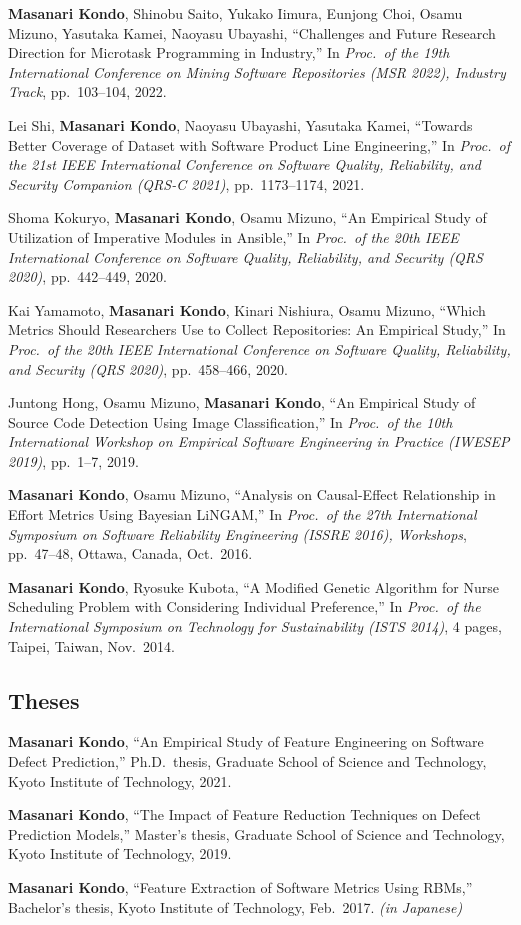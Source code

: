 \documentclass[10pt,a4paper]{article}
\newcommand{\me}{\textbf{Masanari Kondo}}
\newcommand{\inJP}{\textit{(in Japanese)}}
\begin{document}
\begin{publist}[label={[C\arabic*]}]
  \item \me, Shinobu Saito, Yukako Iimura, Eunjong Choi, Osamu Mizuno, Yasutaka Kamei, Naoyasu Ubayashi, ``Challenges and Future Research Direction for Microtask Programming in Industry,'' In \textit{Proc.\ of the 19th International Conference on Mining Software Repositories (MSR 2022), Industry Track}, pp.\ 103--104, 2022.
  \item Lei Shi, \me, Naoyasu Ubayashi, Yasutaka Kamei, ``Towards Better Coverage of Dataset with Software Product Line Engineering,'' In \textit{Proc.\ of the 21st IEEE International Conference on Software Quality, Reliability, and Security Companion (QRS-C 2021)}, pp.\ 1173--1174, 2021.
  \item Shoma Kokuryo, \me, Osamu Mizuno, ``An Empirical Study of Utilization of Imperative Modules in Ansible,'' In \textit{Proc.\ of the 20th IEEE International Conference on Software Quality, Reliability, and Security (QRS 2020)}, pp.\ 442--449, 2020.
  \item Kai Yamamoto, \me, Kinari Nishiura, Osamu Mizuno, ``Which Metrics Should Researchers Use to Collect Repositories: An Empirical Study,'' In \textit{Proc.\ of the 20th IEEE International Conference on Software Quality, Reliability, and Security (QRS 2020)}, pp.\ 458--466, 2020.
  \item Juntong Hong, Osamu Mizuno, \me, ``An Empirical Study of Source Code Detection Using Image Classification,'' In \textit{Proc.\ of the 10th International Workshop on Empirical Software Engineering in Practice (IWESEP 2019)}, pp.\ 1--7, 2019.
  \item \me, Osamu Mizuno, ``Analysis on Causal-Effect Relationship in Effort Metrics Using Bayesian LiNGAM,'' In \textit{Proc.\ of the 27th International Symposium on Software Reliability Engineering (ISSRE 2016), Workshops}, pp.\ 47--48, Ottawa, Canada, Oct.\ 2016.
  \item \me, Ryosuke Kubota, ``A Modified Genetic Algorithm for Nurse Scheduling Problem with Considering Individual Preference,'' In \textit{Proc.\ of the International Symposium on Technology for Sustainability (ISTS 2014)}, 4 pages, Taipei, Taiwan, Nov.\ 2014.
\end{publist}

\subsection{Theses}
\begin{publist}[label={[T\arabic*]}]
  \item \me, ``An Empirical Study of Feature Engineering on Software Defect Prediction,'' Ph.D.\ thesis, Graduate School of Science and Technology, Kyoto Institute of Technology, 2021.
  \item \me, ``The Impact of Feature Reduction Techniques on Defect Prediction Models,'' Master's thesis, Graduate School of Science and Technology, Kyoto Institute of Technology, 2019.
  \item \me, ``Feature Extraction of Software Metrics Using RBMs,'' Bachelor's thesis, Kyoto Institute of Technology, Feb.\ 2017. \inJP
\end{publist}
\end{document}
